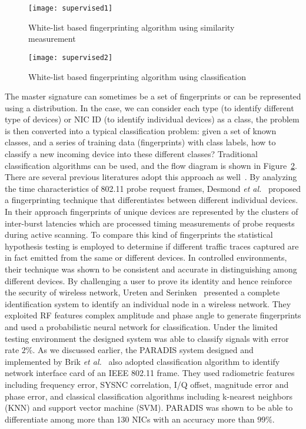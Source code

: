 \documentclass[journal,draftcls,onecolumn,11pt]{IEEEtran}
\begin{document}
\begin{figure}[ht!]
\centering
\texttt{[image: supervised1]}
\caption{White-list based fingerprinting algorithm using similarity measurement}
\label{supervised1}
\end{figure}

\begin{figure}[ht!]
\centering
\texttt{[image: supervised2]}
\caption{White-list based fingerprinting algorithm using classification}
\label{supervised2}
\end{figure}

The master signature can sometimes be a set of fingerprints or can be represented using a distribution. In the case, we can consider each type (to identify different type of devices) or NIC ID (to identify individual devices) as a class, the problem is then converted into a typical classification problem: given a set of known classes, and a series of training data (fingerprints) with class labels, how to classify a new incoming device into these different classes? Traditional classification algorithms can be used, and the flow diagram is shown in Figure~\ref{supervised2}. There are several previous literatures adopt this approach as well~\cite{Bratus2008,Ureten2007,Brik2008,Scanlon2010,Hall2005}. By analyzing the time characteristics of 802.11 probe request frames, Desmond \textit{et al.}~\cite{Desmond2008} proposed a fingerprinting technique that differentiates between different individual devices. In their approach fingerprints of unique devices are represented by the clusters of inter-burst latencies which are processed timing measurements of probe requests during active scanning. To compare this kind of fingerprints the statistical hypothesis testing is employed to determine if different traffic traces captured are in fact emitted from the same or different devices.  In controlled environments, their technique was shown to be consistent and accurate in distinguishing among different devices. By challenging a user to prove its identity and hence reinforce the security of wireless network, Ureten and Serinken~\cite{Ureten2007} presented a complete identification system to identify an individual node in a wireless network. They exploited RF features complex amplitude and phase angle to generate fingerprints and used a probabilistic neural network for classification. Under the limited testing environment the designed system was able to classify signals with error rate $2\%$. As we discussed earlier, the PARADIS system designed and implemented by Brik \textit{et al.}~\cite{Brik2008} also adopted classification algorithm to identify network interface card of an IEEE 802.11 frame. They used radiometric features including frequency error, SYSNC correlation, I/Q offset, magnitude error and phase error, and classical classification algorithms including k-nearest neighbors (KNN) and support vector machine (SVM). PARADIS was shown to be able to differentiate among more than 130 NICs with an accuracy more than $99\%$.
\end{document}
